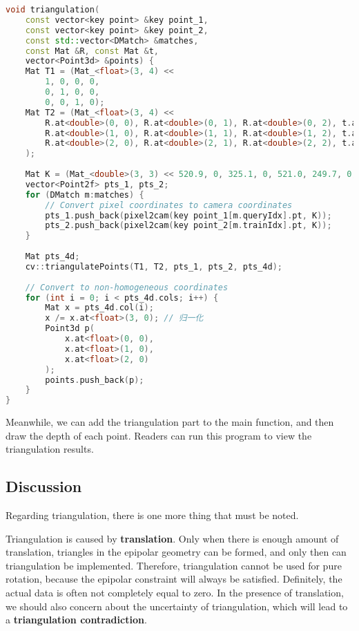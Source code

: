 \begin{lstlisting}[language=c++,caption=slambook2/ch7/triangulation.cpp（片段）]
void triangulation(
	const vector<key point> &key point_1,
	const vector<key point> &key point_2,
	const std::vector<DMatch> &matches,
	const Mat &R, const Mat &t,
	vector<Point3d> &points) {
	Mat T1 = (Mat_<float>(3, 4) <<
		1, 0, 0, 0,
		0, 1, 0, 0,
		0, 0, 1, 0);
	Mat T2 = (Mat_<float>(3, 4) <<
		R.at<double>(0, 0), R.at<double>(0, 1), R.at<double>(0, 2), t.at<double>(0, 0),
		R.at<double>(1, 0), R.at<double>(1, 1), R.at<double>(1, 2), t.at<double>(1, 0),
		R.at<double>(2, 0), R.at<double>(2, 1), R.at<double>(2, 2), t.at<double>(2, 0)
	);
	
	Mat K = (Mat_<double>(3, 3) << 520.9, 0, 325.1, 0, 521.0, 249.7, 0, 0, 1);
	vector<Point2f> pts_1, pts_2;
	for (DMatch m:matches) {
		// Convert pixel coordinates to camera coordinates
		pts_1.push_back(pixel2cam(key point_1[m.queryIdx].pt, K));
		pts_2.push_back(pixel2cam(key point_2[m.trainIdx].pt, K));
	}
	
	Mat pts_4d;
	cv::triangulatePoints(T1, T2, pts_1, pts_2, pts_4d);
	
	// Convert to non-homogeneous coordinates
	for (int i = 0; i < pts_4d.cols; i++) {
		Mat x = pts_4d.col(i);
		x /= x.at<float>(3, 0); // 归一化
		Point3d p(
			x.at<float>(0, 0),
			x.at<float>(1, 0),
			x.at<float>(2, 0)
		);
		points.push_back(p);
	}
}
\end{lstlisting}

Meanwhile, we can add the triangulation part to the main function, and then draw the depth of each point. Readers can run this program to view the triangulation results.

\subsection{Discussion}
Regarding triangulation, there is one more thing that must be noted.

Triangulation is caused by \textbf{translation}. Only when there is enough amount of translation, triangles in the epipolar geometry can be formed, and only then can triangulation be implemented. Therefore, triangulation cannot be used for pure rotation, because the epipolar constraint will always be satisfied. Definitely, the actual data is often not completely equal to zero. In the presence of translation, we should also concern about the uncertainty of triangulation, which will lead to a \textbf{triangulation contradiction}.

